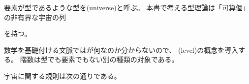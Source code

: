 \documentclass[index]{subfiles}
\begin{document}

要素が型であるような型を(universe)と呼ぶ。
本書で考える型理論は「可算個」の非有界な宇宙の列
\begin{myDisplayMath}
   \myElemOf
   \myElemOf
   \myElemOf
  \myDots
\end{myDisplayMath}
を持つ。

数学を基礎付ける文脈ではが何なのか分からないので、
(level)の概念を導入する。
階数は型でも要素でもない別の種類の対象である。



宇宙に関する規則は次の通りである。



\end{document}
